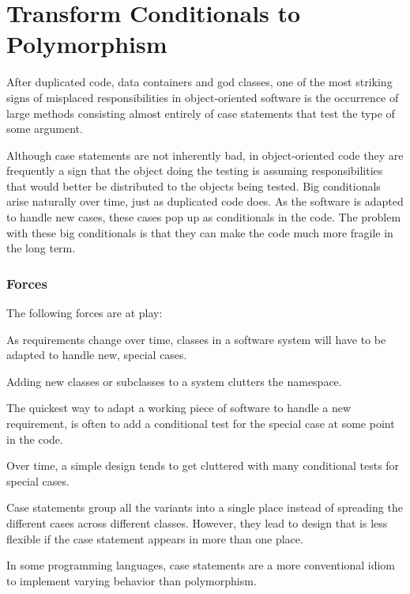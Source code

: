 \documentclass[a4paper,10pt,twoside]{book}
\begin{document}
	\renewcommand{\nnbb}[2]{} %
	\sloppy
\fi
\chapter{Transform Conditionals to Polymorphism}

After duplicated code, data containers and god classes, one of the most striking signs of misplaced responsibilities in object-oriented software is the occurrence of large methods consisting almost entirely of case statements that test the type of some argument. 

Although case statements are not inherently bad, in object-oriented code they are frequently a sign that the object doing the testing is assuming responsibilities that would better be distributed to the objects being tested. Big conditionals arise naturally over time, just as duplicated code does. As the software is adapted to handle new cases, these cases pop up as conditionals in the code. The problem with these big conditionals is that they can make the code much more fragile in the long term.

\subsection*{Forces}

The following forces are at play:

\begin{bulletlist}
\item As requirements change over time, classes in a software system will have to be adapted to handle new, special cases.

\item Adding new classes or subclasses to a system clutters the namespace.

\item The quickest way to adapt a working piece of software to handle a new requirement, is often to add a conditional test for the special case at some point in the code.

\item Over time, a simple design tends to get cluttered with many conditional tests for special cases.

\item Case statements group all the variants into a single place instead of spreading the different cases across different classes. However, they lead to design that is less flexible if the case statement appears in more than one place. 

\item In some programming languages, case statements are a more conventional idiom to implement varying behavior than polymorphism.
\end{bulletlist}
\end{document}
